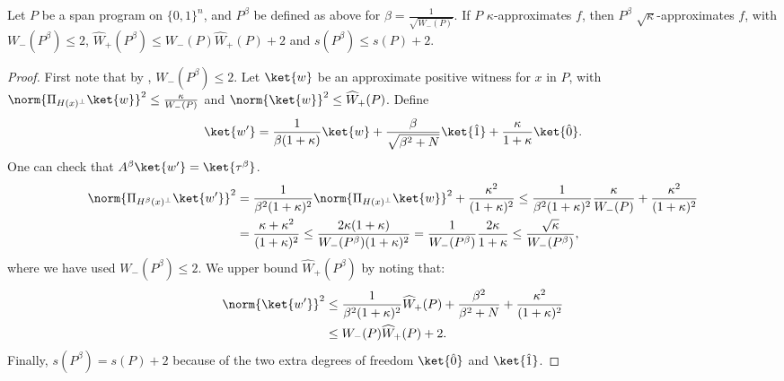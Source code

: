 \documentclass{toc}
\begin{document}
\begin{corollary}\label{cor:scaling}
Let $P$ be a span program on $\{0,1\}^n$, and $P^\beta$ be defined as above for $\beta=\frac{1}{\sqrt{W_-(P)}}$. If $P$ $\kappa$-approximates $f$, then $P^\beta$ $\sqrt{\kappa}$-approximates $f$, with $W_-(P^
\beta)\leq 2$, $\widehat{W}_+(P^\beta)\leq W_-(P)\widehat{W}_+(P)+2$ and $s(P^{\beta})\leq s(P)+2$.
\end{corollary}
\begin{proof}
First note that by , $W_-(P^\beta)\leq 2$.
Let $\ket{w}$ be an approximate positive witness for $x$ in $P$, with $\norm{\Pi_{H(x)^\bot}\ket{w}}^2\leq\frac{\kappa}{W_-(P)}$ and $\norm{\ket{w}}^2\leq \widehat{W}_+(P)$. Define 
$$\ket{w'}=\frac{1}{\beta(1+\kappa)}\ket{w}+\frac{\beta}{\sqrt{\beta^2+N}}\ket{\hat{1}}+\frac{\kappa}{1+\kappa}\ket{\hat{0}}.$$
One can check that $A^\beta\ket{w'}=\ket{\tau^\beta}$. 
\begin{align*}
\norm{\Pi_{H^\beta(x)^\bot}\ket{w'}}^2 & =\frac{1}{\beta^2(1+\kappa)^2}\norm{\Pi_{H(x)^\bot}\ket{w}}^2+\frac{\kappa^2}{(1+\kappa)^2} 
\leq  \frac{1}{\beta^2(1+\kappa)^2}\frac{\kappa}{W_-(P)}+\frac{\kappa^2}{(1+\kappa)^2}\\
&= \frac{\kappa+\kappa^2}{(1+\kappa)^2}\leq \frac{2\kappa(1+\kappa)}{W_-(P^\beta)(1+\kappa)^2} = \frac{1}{W_-(P^\beta)}\frac{2\kappa}{1+\kappa}\leq \frac{\sqrt{\kappa}}{W_-(P^\beta)},
\end{align*}
where we have used $W_-(P^\beta)\leq 2$. We upper bound $\widehat{W}_+(P^\beta)$ by noting that:
\begin{align*}
\norm{\ket{w'}}^2 &\leq  \frac{1}{\beta^2(1+\kappa)^2}\widehat{W}_+(P)+\frac{\beta^2}{\beta^2+N}+\frac{\kappa^2}{(1+\kappa)^2}\\
&\leq W_-(P)\widehat{W}_+(P)+2. 
\end{align*}
Finally, $s(P^\beta)=s(P)+2$ because of the two extra degrees of freedom $\ket{\hat{0}}$ and $\ket{\hat{1}}$.
\end{proof}
\end{document}
